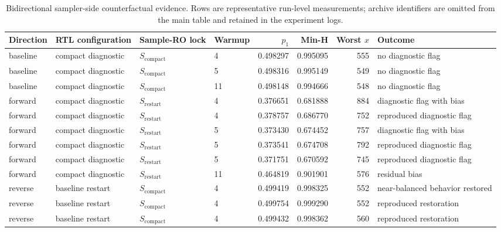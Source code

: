 \documentclass[journal]{IEEEtran}
\newcommand{\scompact}{$S_\mathrm{compact}$}
\newcommand{\srestart}{$S_\mathrm{restart}$}
\begin{document}
\begin{table}[t]
\centering
\caption{Bidirectional sampler-side counterfactual evidence. Rows are representative run-level measurements; archive identifiers are omitted from the main table and retained in the experiment logs.}
\label{tab:samplero}
\scriptsize
\begin{tabular}{llllrrrL{0.22\textwidth}}
\toprule
Direction & RTL configuration & Sample-RO lock & Warmup & $p_1$ & Min-H & Worst $x$ & Outcome \\
\midrule
baseline & compact diagnostic & \scompact{} & 4  & 0.498297 & 0.995095 & 555 & no diagnostic flag \\
baseline & compact diagnostic & \scompact{} & 5  & 0.498316 & 0.995149 & 549 & no diagnostic flag \\
baseline & compact diagnostic & \scompact{} & 11 & 0.498148 & 0.994666 & 548 & no diagnostic flag \\
forward & compact diagnostic & \srestart{} & 4 & 0.376651 & 0.681888 & 884 & diagnostic flag with bias \\
forward & compact diagnostic & \srestart{} & 4 & 0.378757 & 0.686770 & 752 & reproduced diagnostic flag \\
forward & compact diagnostic & \srestart{} & 5 & 0.373430 & 0.674452 & 757 & diagnostic flag with bias \\
forward & compact diagnostic & \srestart{} & 5 & 0.373541 & 0.674708 & 792 & reproduced diagnostic flag \\
forward & compact diagnostic & \srestart{} & 5 & 0.371751 & 0.670592 & 745 & reproduced diagnostic flag \\
forward & compact diagnostic & \srestart{} & 11 & 0.464819 & 0.901901 & 576 & residual bias \\
reverse & baseline restart & \scompact{} & 4 & 0.499419 & 0.998325 & 552 & near-balanced behavior restored \\
reverse & baseline restart & \scompact{} & 4 & 0.499754 & 0.999290 & 552 & reproduced restoration \\
reverse & baseline restart & \scompact{} & 4 & 0.499432 & 0.998362 & 560 & reproduced restoration \\
\bottomrule
\end{tabular}
\end{table}
\end{document}

